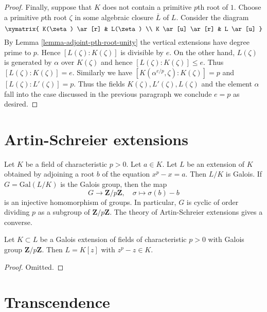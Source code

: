 \begin{proof}
\medskip\noindent
Finally, suppose that $K$ does not contain a primitive
$p$th root of $1$.
Choose a primitive $p$th root $\zeta$ in some algebraic closure
$\overline{L}$ of $L$. Consider the diagram
$$
\xymatrix{
K(\zeta) \ar[r] & L(\zeta) \\
K \ar[u] \ar[r] & L \ar[u]
}
$$
By Lemma \ref{lemma-adjoint-pth-root-unity}
the vertical extensions have degree prime to $p$.
Hence $[L(\zeta) : K(\zeta)]$ is divisible by $e$.
On the other hand, $L(\zeta)$ is generated by $\alpha$
over $K(\zeta)$ and hence $[L(\zeta) : K(\zeta)] \leq e$.
Thus $[L(\zeta) : K(\zeta)] = e$. Similarly we have
$[K(\alpha^{e/p}, \zeta) : K(\zeta)] = p$ and
$[L(\zeta) : L'(\zeta)] = p$. Thus the fields
$K(\zeta), L'(\zeta), L(\zeta)$ and the element $\alpha$
fall into the case discussed
in the previous paragraph we conclude $e = p$ as desired.
\end{proof}




\section{Artin-Schreier extensions}
\label{section-Artin-Schreier}

\noindent
Let $K$ be a field of characteristic $p > 0$. Let $a \in K$. Let $L$ be an
extension of $K$ obtained by adjoining a root $b$ of the equation
$x^p - x = a$. Then $L/K$ is Galois. If $G = \text{Gal}(L/K)$ is the Galois
group, then the map
$$
G \longrightarrow \mathbf{Z}/p\mathbf{Z},\quad
\sigma \longmapsto \sigma(b) - b
$$
is an injective homomorphism of groups. In particular, $G$ is cyclic
of order dividing $p$ as a subgroup of $\mathbf{Z}/p\mathbf{Z}$.
The theory of Artin-Schreier extensions gives a converse.

\begin{lemma}
\label{lemma-Artin-Schreier}
Let $K \subset L$ be a Galois extension of fields of characteristic $p > 0$
with Galois group $\mathbf{Z}/p\mathbf{Z}$. Then $L = K[z]$ with
$z^p - z \in K$.
\end{lemma}

\begin{proof}
Omitted.
\end{proof}



\section{Transcendence}
\label{section-transcendence}

